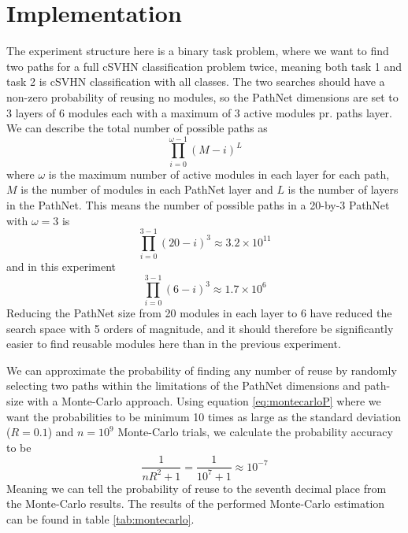 \section{Implementation}
The experiment structure here is a binary task problem, where we want to find two paths for a full cSVHN classification problem twice, meaning both task 1 and task 2 is cSVHN classification with all classes. The two searches should have a non-zero probability of reusing no modules, so the PathNet dimensions are set to 3 layers of 6 modules each with a maximum of 3 active modules pr. paths layer. We can describe the total number of possible paths as 
\begin{equation*}
    \prod_{i=0}^{\omega-1}(M-i)^{L}
\end{equation*}
where \(\omega\) is the maximum number of active modules in each layer for each path, \(M\) is the number of modules in each PathNet layer and  \(L\) is the number of layers in the PathNet. This means the number of possible paths in a 20-by-3 PathNet with \(\omega=3\) is  
\begin{equation*}
    \prod_{i=0}^{3-1}(20-i)^{3}\approx 3.2\times10^{11}
\end{equation*}
and in this experiment
\begin{equation*}
    \prod_{i=0}^{3-1}(6-i)^{3}\approx 1.7\times10^{6}
\end{equation*}
Reducing the PathNet size from 20 modules in each layer to 6 have reduced the search space with 5 orders of magnitude, and it should therefore be significantly easier to find reusable modules here than in the previous experiment.

We can approximate the probability of finding any number of reuse by randomly selecting two paths within the limitations of the PathNet dimensions and path-size with a Monte-Carlo approach. Using equation \ref{eq:montecarloP} where we want the probabilities to be minimum 10 times as large as the standard deviation (\(R=0.1\)) and \(n=10^{9}\) Monte-Carlo trials, we calculate the probability accuracy to be 
\begin{equation*}
    \frac{1}{nR^{2}+1}=\frac{1}{10^{7}+1}\approx10^{-7}
\end{equation*}
Meaning we can tell the probability of reuse to the seventh decimal place from the Monte-Carlo results. The results of the performed Monte-Carlo estimation can be found in table \ref{tab:montecarlo}.



